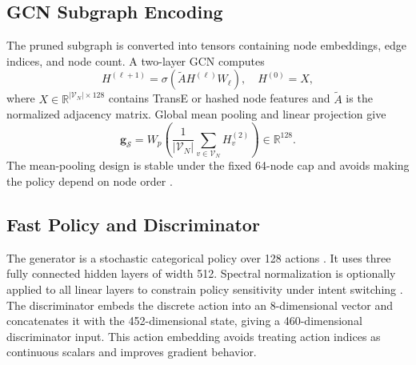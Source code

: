 \documentclass[journal]{IEEEtran}
\newcommand{\SG}{\mathcal{S}}
\newcommand{\calV}{\mathcal{V}}
\newcommand{\R}{\mathbb{R}}
\begin{document}
\subsection{GCN Subgraph Encoding}

The pruned subgraph is converted into tensors containing node embeddings, edge indices, and node count. A two-layer GCN computes
\begin{equation}
H^{(\ell+1)}
=\sigma\left(\tilde{A}H^{(\ell)}W_\ell\right),
\quad H^{(0)}=X,
\end{equation}
where $X\in\R^{|\calV_N|\times 128}$ contains TransE or hashed node features and $\tilde{A}$ is the normalized adjacency matrix. Global mean pooling and linear projection give
\begin{equation}
\mathbf{g}_{\SG}
=W_p\left(\frac{1}{|\calV_N|}
\sum_{v\in\calV_N}H^{(2)}_v\right)\in\R^{128}.
\label{eq:gcn_embedding}
\end{equation}
The mean-pooling design is stable under the fixed 64-node cap and avoids making the policy depend on node order \cite{kipf2017semi}.

\subsection{Fast Policy and Discriminator}

The generator is a stochastic categorical policy over 128 actions \cite{ho2016gail}. It uses three fully connected hidden layers of width 512. Spectral normalization is optionally applied to all linear layers to constrain policy sensitivity under intent switching \cite{miyato2018spectral}. The discriminator embeds the discrete action into an 8-dimensional vector and concatenates it with the 452-dimensional state, giving a 460-dimensional discriminator input. This action embedding avoids treating action indices as continuous scalars and improves gradient behavior.
\end{document}

